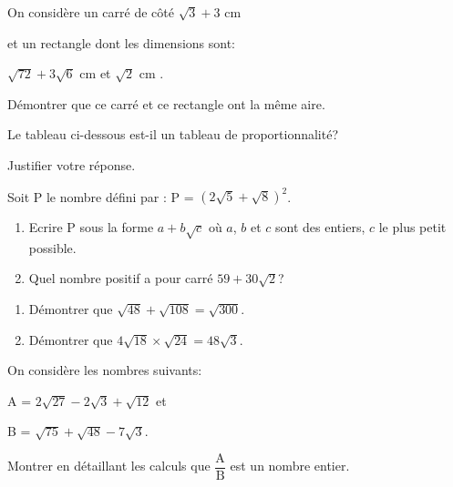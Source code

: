 

\begin{exercice}
On considère un carré de côté $\sqrt{3} + 3$ cm 

et un rectangle dont les  dimensions  sont:

 $\sqrt{72}+ 3\sqrt{6}$ cm  et $\sqrt{2}$ cm .

Démontrer que ce carré et ce rectangle ont la même aire.
\end{exercice}


\begin{exercice}
Le tableau ci-dessous est-il un tableau de proportionnalité?

Justifier votre réponse.
\end{exercice} 


\begin{exercice}
Soit P le nombre défini par : P = $\left( 2 \sqrt{5}+\sqrt{8}\right) ^2$.

\begin{enumerate}
\item Ecrire P sous la forme $a+b\sqrt{c}$ où $a$, $b$ et $c$ sont des entiers, $c$ le plus petit possible.
\item Quel nombre positif a pour carré $59+30\sqrt{2}$?
\end{enumerate}
\end{exercice} 

\begin{exercice}

\begin{enumerate}
\item Démontrer que $\sqrt{48}+\sqrt{108}=\sqrt{300}$.
\item Démontrer que $4\sqrt{18} \times \sqrt{24}=48\sqrt{3}$.
\end{enumerate}
\end{exercice} 

\begin{exercice}
On considère les nombres suivants:

A = $2\sqrt{27}-2\sqrt{3}+\sqrt{12}$ et 

B = $\sqrt{75}+\sqrt{48}-7\sqrt{3}$.

Montrer en détaillant les calculs que $\dfrac{\text{A}}{\text{B}}$ est un nombre entier.
\end{exercice} 








